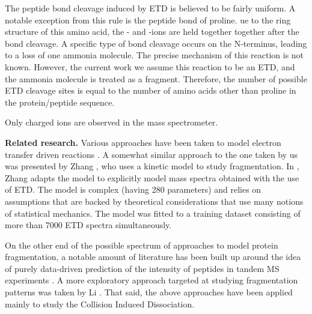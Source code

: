 \documentclass{llncs}
\begin{document}

        The peptide bond cleavage induced by ETD is believed to be fairly uniform. A notable exception from this rule is the peptide bond of proline. ue to the ring structure of this amino acid, the - and -ions are held together together after the  bond cleavage. A specific type of  bond cleavage occurs on the N-terminus, leading to a loss of one ammonia molecule. The precise mechanism of this reaction is not known. However, the current work we assume this reaction to be an ETD, and the ammonia molecule is treated as a  fragment. Therefore, the number of possible ETD cleavage sites is equal to the number of amino acids other than proline in the protein/peptide sequence.

        Only charged ions are observed in the mass spectrometer.

\textbf{Related research.}
        Various approaches have been taken to model electron transfer driven reactions \cite{Breuker2004-az,Simons2010-gy,Zhurov2013-ua,Turecek2013-fq}. A somewhat similar approach to the one taken by us was presented by Zhang \cite{Zhang2004-fp,Zhang2005-jn,Zhang2011-lg}, who uses a kinetic model to study fragmentation. In \cite{Zhang2010-fp}, Zhang adapts the model to explicitly model mass spectra obtained with the use of ETD. The model is complex (having 280 parameters) and relies on assumptions that are backed by theoretical considerations that use many notions of statistical mechanics. The model was fitted to a training dataset consisting of more than 7000 ETD spectra simultaneously.

        On the other end of the possible spectrum of approaches to model protein fragmentation, a notable amount of literature has been built up around the idea of purely data-driven prediction of the intensity of peptides in tandem MS experiments \cite{Elias2004-fr,Arnold2006-wn,Degroeve2013-ej} . A more exploratory approach targeted at studying fragmentation patterns was taken by Li \cite{Li2011-mq}. That said, the above approaches have been applied mainly to study the Collision Induced Dissociation.
\end{document}

